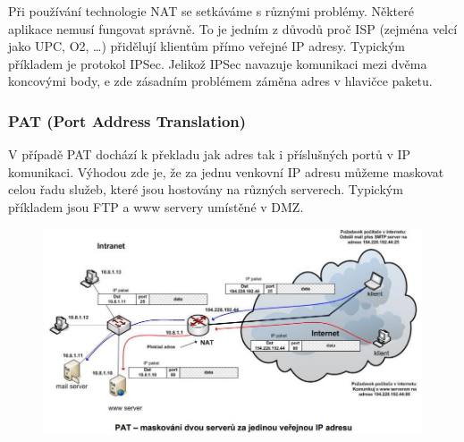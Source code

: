 Při používání technologie NAT se setkáváme s různými problémy. Některé aplikace nemusí fungovat správně. To je jedním z důvodů proč ISP (zejména velcí jako UPC, O2, …) přidělují klientům přímo veřejné IP adresy. Typickým příkladem je protokol IPSec. Jelikož IPSec navazuje komunikaci mezi dvěma koncovými body, e zde zásadním problémem záměna adres v hlavičce paketu. 

\subsubsection{PAT (Port Address Translation)}
V případě PAT dochází k překladu jak adres tak i příslušných portů v IP komunikaci. Výhodou zde je, že za jednu venkovní IP adresu můžeme maskovat celou řadu služeb, které jsou hostovány na různých serverech. Typickým příkladem jsou FTP a www servery umístěné v DMZ. 
\begin{figure}[H]
\centering
\includegraphics[width=1\textwidth]{assets/6_pat_mask}
\end{figure}